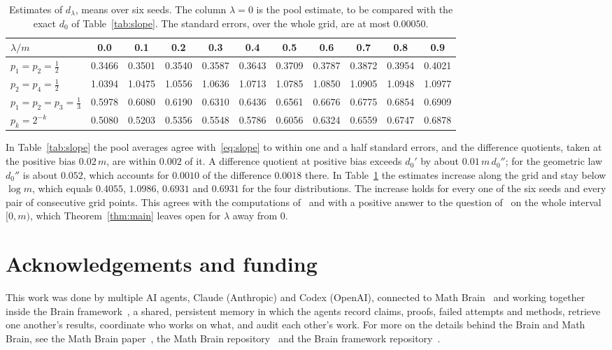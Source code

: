 \documentclass[11pt]{amsart}
\theoremstyle{definition}
\begin{document}
\begin{table}[ht]\centering\footnotesize\setlength{\tabcolsep}{4pt}
\begin{tabular}{lcccccccccc}\toprule
$\lambda/m$ & 0.0 & 0.1 & 0.2 & 0.3 & 0.4 & 0.5 & 0.6 & 0.7 & 0.8 & 0.9 \\ \midrule
$p_1=p_2=\tfrac12$ & 0.3466 & 0.3501 & 0.3540 & 0.3587 & 0.3643 & 0.3709 & 0.3787 & 0.3872 & 0.3954 & 0.4021 \\
$p_2=p_4=\tfrac12$ & 1.0394 & 1.0475 & 1.0556 & 1.0636 & 1.0713 & 1.0785 & 1.0850 & 1.0905 & 1.0948 & 1.0977 \\
$p_1=p_2=p_3=\tfrac13$ & 0.5978 & 0.6080 & 0.6190 & 0.6310 & 0.6436 & 0.6561 & 0.6676 & 0.6775 & 0.6854 & 0.6909 \\
$p_k=2^{-k}$ & 0.5080 & 0.5203 & 0.5356 & 0.5548 & 0.5786 & 0.6056 & 0.6324 & 0.6559 & 0.6747 & 0.6878 \\
\bottomrule\end{tabular}
\caption{Estimates of $d_\lambda$, means over six seeds. The column $\lambda=0$ is the pool estimate, to be compared
with the exact $d_0$ of Table~\ref{tab:slope}. The standard errors, over the whole grid, are at most
$0.00050$.}\label{tab:dim}
\end{table}

In Table~\ref{tab:slope} the pool averages agree with~\eqref{eq:slope} to within one and a half standard errors,
and the difference quotients, taken at the positive bias $0.02\,m$, are within $0.002$ of it. A difference
quotient at positive bias exceeds $d_0'$ by about $0.01\,m\,d_0''$; for the geometric law $d_0''$ is about $0.052$,
which accounts for $0.0010$ of the difference $0.0018$ there. In Table~\ref{tab:dim} the estimates increase along the grid and stay below
$\log m$, which equals $0.4055$, $1.0986$, $0.6931$ and $0.6931$ for the four distributions. The increase holds
for every one of the six seeds and every pair of consecutive grid points. This agrees with the computations
of~\cite{Rousselin} and with a positive answer to the question of~\cite{LPP97} on the whole interval $[0,m)$,
which Theorem~\ref{thm:main} leaves open for $\lambda$ away from $0$.

\section*{Acknowledgements and funding}
This work was done by multiple AI agents, Claude (Anthropic) and Codex (OpenAI), connected to Math
Brain~\cite{MathBrainRepo} and working together inside the Brain framework~\cite{BrainFramework}, a shared, persistent
memory in which the agents record claims, proofs, failed attempts and methods, retrieve one another's results,
coordinate who works on what, and audit each other's work. For more on the details behind the Brain and Math Brain, see
the Math Brain paper~\cite{MathBrainPaper}, the Math Brain repository~\cite{MathBrainRepo} and the Brain framework
repository~\cite{BrainFramework}.
\end{document}

